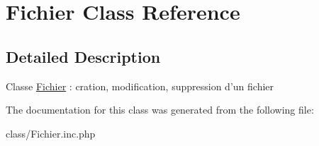 \hypertarget{class_fichier}{
\section{Fichier Class Reference}
\label{class_fichier}
}


\subsection{Detailed Description}
Classe \hyperlink{class_fichier}{Fichier} : cration, modification, suppression d'un fichier 

The documentation for this class was generated from the following file:\begin{DoxyCompactItemize}
\item 
class/Fichier.inc.php\end{DoxyCompactItemize}
